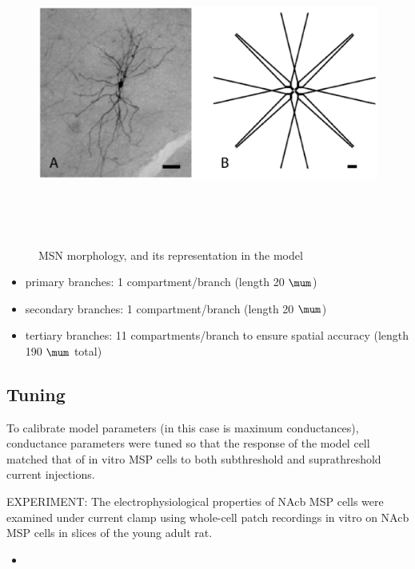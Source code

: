 \begin{figure}[hbt]
  \centerline{
\includegraphics[height=10cm,
    angle=0]{./images/MSN-Wolf2005.eps}
    }
\caption{MSN morphology, and its representation in the model}
\label{fig:MSN-Wolf}
\end{figure}

\begin{itemize}
  \item primary branches: 1 compartment/branch (length 20 $\mum$)
  \item secondary branches: 1 compartment/branch (length 20 $\mum$)
  \item tertiary branches: 11 compartments/branch to ensure spatial accuracy 
  (length 190 $\mum$ total)
\end{itemize}

\subsection{Tuning}

To calibrate model parameters (in this case is maximum conductances),
conductance parameters were tuned so that the response of the model cell matched
that of in vitro MSP cells to both subthreshold and suprathreshold current
injections.

EXPERIMENT: The electrophysiological properties of NAcb MSP cells were examined
under current clamp using whole-cell patch recordings in vitro on NAcb MSP cells
in slices of the young adult rat.
\begin{itemize}
  \item 
\end{itemize}

